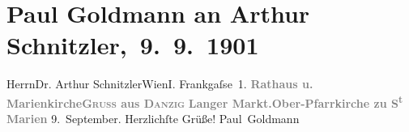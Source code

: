 

         
         \renewcommand{\erwaehntePersonen}{Personen: Paul Goldmann}
         \renewcommand{\erwaehnteOrte}{Orte: Danzig, Frankgasse 1, Langer Markt, Marienkirche, Rechtstädtisches Rathaus, Wien}
         \renewcommand{\erwaehnteWerke}{}
               \section[ Paul Goldmann an Arthur Schnitzler, 9. 9. 1901]{ Paul Goldmann an Arthur Schnitzler, 9. 9. 1901}\nopagebreak{}\rehead{ }\begin{ledgroupsized}[t]{13cm}\normalsize\beginnumbering \toendnotes[C]{\smallbreak\pagebreak[2]} 
\pstart{}{\pb}Herrn\pend{}\pstart{}Dr. Arthur Schnitzler\pend{}\pstart{}Wien\pend{}\pstart{}I\damage{\textcolor{gray}{X}}. Frankgaſse 1.\pend{}{\bigskip}\pstart
           \noindent{}{\pb}\textcolor{gray}{\textbf{Rathaus u.{ }Marienkirche}}\hfill \textcolor{gray}{\textbf{\textsc{Gruss} aus \textsc{Danzig}}}\pend
           \pstart
           \textcolor{gray}{\textbf{Langer Markt.}}\hfill \textcolor{gray}{\textbf{Ober-Pfarrkirche zu S\textsuperscript{t} Marien}}\pend
           \pstart
           \centering{}9. September.\pend
           \pstart
           Herzlichſte Grüße!\pend
           \pstart \spacefill\mbox{Paul Goldmann}\pend{}
         
         \endnumbering{}\end{ledgroupsized}  \newcommand{\dateiname}{L03083}\newcommand{\titel}{Paul Goldmann an Arthur Schnitzler, 9. 9. 1901}\newcommand{\editorInnen}{Martin Anton Müller und Laura Untner}
      